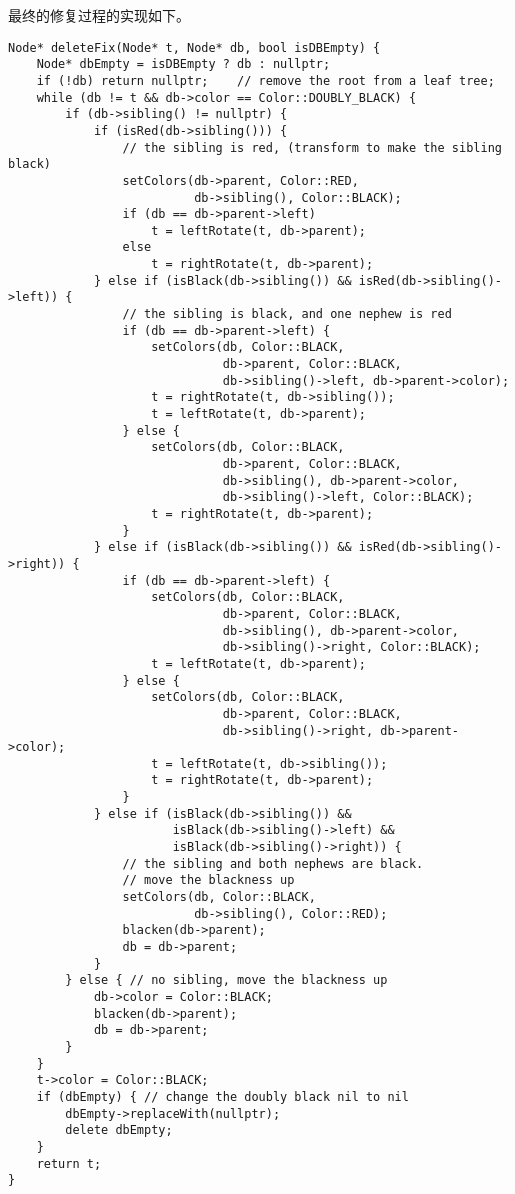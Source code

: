 \documentclass[UTF8]{article}
\begin{document}
最终的修复过程的实现如下。

\begin{lstlisting}
Node* deleteFix(Node* t, Node* db, bool isDBEmpty) {
    Node* dbEmpty = isDBEmpty ? db : nullptr;
    if (!db) return nullptr;    // remove the root from a leaf tree;
    while (db != t && db->color == Color::DOUBLY_BLACK) {
        if (db->sibling() != nullptr) {
            if (isRed(db->sibling())) {
                // the sibling is red, (transform to make the sibling black)
                setColors(db->parent, Color::RED,
                          db->sibling(), Color::BLACK);
                if (db == db->parent->left)
                    t = leftRotate(t, db->parent);
                else
                    t = rightRotate(t, db->parent);
            } else if (isBlack(db->sibling()) && isRed(db->sibling()->left)) {
                // the sibling is black, and one nephew is red
                if (db == db->parent->left) {
                    setColors(db, Color::BLACK,
                              db->parent, Color::BLACK,
                              db->sibling()->left, db->parent->color);
                    t = rightRotate(t, db->sibling());
                    t = leftRotate(t, db->parent);
                } else {
                    setColors(db, Color::BLACK,
                              db->parent, Color::BLACK,
                              db->sibling(), db->parent->color,
                              db->sibling()->left, Color::BLACK);
                    t = rightRotate(t, db->parent);
                }
            } else if (isBlack(db->sibling()) && isRed(db->sibling()->right)) {
                if (db == db->parent->left) {
                    setColors(db, Color::BLACK,
                              db->parent, Color::BLACK,
                              db->sibling(), db->parent->color,
                              db->sibling()->right, Color::BLACK);
                    t = leftRotate(t, db->parent);
                } else {
                    setColors(db, Color::BLACK,
                              db->parent, Color::BLACK,
                              db->sibling()->right, db->parent->color);
                    t = leftRotate(t, db->sibling());
                    t = rightRotate(t, db->parent);
                }
            } else if (isBlack(db->sibling()) &&
                       isBlack(db->sibling()->left) &&
                       isBlack(db->sibling()->right)) {
                // the sibling and both nephews are black.
                // move the blackness up
                setColors(db, Color::BLACK,
                          db->sibling(), Color::RED);
                blacken(db->parent);
                db = db->parent;
            }
        } else { // no sibling, move the blackness up
            db->color = Color::BLACK;
            blacken(db->parent);
            db = db->parent;
        }
    }
    t->color = Color::BLACK;
    if (dbEmpty) { // change the doubly black nil to nil
        dbEmpty->replaceWith(nullptr);
        delete dbEmpty;
    }
    return t;
}
\end{lstlisting}
\end{document}
